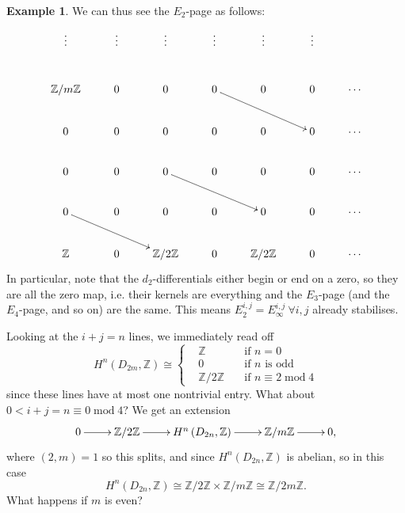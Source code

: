 \documentclass{article}
\newcommand{\Z}{\mathbb{Z}}
\newcommand{\Mod}{\operatorname{mod}}
\theoremstyle{definition}
\newtheorem{example}[defn]{Example}
\begin{document}
\begin{example}
We can thus see the $E_2$-page as follows:
\[
\xymatrix{
\vdots & \vdots & \vdots & \vdots & \vdots & \vdots \\
\Z/m\Z & 0 & 0 & 0\ar[rrd] & 0 & 0 & \cdots \\
0 & 0 & 0 & 0 & 0 & 0 & \cdots \\
0 & 0 & 0\ar[rrd] & 0 & 0 & 0 & \cdots \\
0\ar[rrd] & 0 & 0 & 0 & 0 & 0 & \cdots \\
\Z & 0 & \Z/2\Z & 0 & \Z/2\Z & 0 & \cdots
}
\]
In particular, note that the $d_2$-differentials either begin or end on a zero, so they are all the zero map, i.e. their kernels are everything and the $E_3$-page (and the $E_4$-page, and so on) are the same. This means $E_2^{i,j}=E_\infty^{i,j} \ \forall i,j$ already stabilises.

Looking at the $i+j=n$ lines, we immediately read off
\[
H^n\left(D_{2m},\Z\right)\cong\left\{
\begin{aligned}
&\Z\quad&\text{if }n=0\\
&0\quad&\text{if }n\text{ is odd}\\
&\Z/2\Z\quad&\text{if }n\equiv 2\Mod 4
\end{aligned}
\right.
\]
since these lines have at most one nontrivial entry. What about $0<i+j=n\equiv 0\Mod 4$? We get an extension
\[
\xymatrix{
0\ar[r] & \Z/2\Z\ar[r] & H^n\left(D_{2n},\Z\right)\ar[r] & \Z/m\Z\ar[r] & 0,
}
\]
where $(2,m)=1$ so this splits, and since $H^n\left(D_{2n},\Z\right)$ is abelian, so in this case
\[
H^n\left(D_{2n},\Z\right)\cong\Z/2\Z\times\Z/m\Z\cong\Z/2m\Z.
\]
What happens if $m$ is even?
\end{example}
\end{document}
